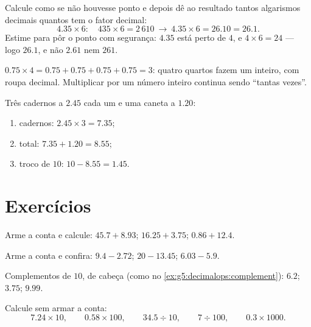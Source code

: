 \begin{method}\label{met:g5:decimalops:mult}
Calcule como se não houvesse ponto e depois dê ao resultado tantos
algarismos decimais quantos tem o fator decimal:
\[
4.35 \times 6: \quad 435 \times 6 = 2\,610
\ \to\ 4.35 \times 6 = 26.10 = 26.1 .
\]
Estime para pôr o ponto com segurança: $4.35$ está perto de $4$, e
$4 \times 6 = 24$ --- logo $26.1$, e não $2.61$ nem $261$.
\end{method}

\begin{example}\label{ex:g5:decimalops:mult}
$0.75 \times 4 = 0.75 + 0.75 + 0.75 + 0.75 = 3$: quatro quartos fazem
um inteiro, com roupa decimal. Multiplicar por um número inteiro
continua sendo ``tantas vezes''.
\end{example}

\begin{example}[Compras]\label{ex:g5:decimalops:shopping}
Três cadernos a $2.45$ cada um e uma caneta a $1.20$:
\begin{enumerate}
  \item cadernos: $2.45 \times 3 = 7.35$;
  \item total: $7.35 + 1.20 = 8.55$;
  \item troco de $10$: $10 - 8.55 = 1.45$.
\end{enumerate}
\end{example}

\section{Exercícios}

\begin{exercise}[$\star$]\label{exo:g5:decimalops:1}
Arme a conta e calcule: $45.7 + 8.93$; \quad $16.25 + 3.75$; \quad
$0.86 + 12.4$.
\end{exercise}

\begin{exercise}[$\star$]\label{exo:g5:decimalops:2}
Arme a conta e confira: $9.4 - 2.72$; \quad $20 - 13.45$;
\quad $6.03 - 5.9$.
\end{exercise}

\begin{exercise}[$\star$]\label{exo:g5:decimalops:3}
Complementos de $10$, de cabeça (como no
\cref{ex:g5:decimalops:complement}): $6.2$; \quad $3.75$; \quad
$9.99$.
\end{exercise}

\begin{exercise}[$\star$]\label{exo:g5:decimalops:4}
Calcule sem armar a conta:
\[
7.24 \times 10, \qquad
0.58 \times 100, \qquad
34.5 \div 10, \qquad
7 \div 100, \qquad
0.3 \times 1000 .
\]
\end{exercise}

